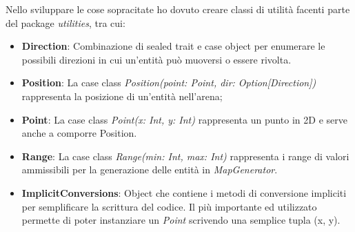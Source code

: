 Nello sviluppare le cose sopracitate ho dovuto creare classi di utilità facenti parte del package \textit{utilities}, tra cui:
\begin{itemize}
    \item \textbf{Direction}: Combinazione di sealed trait e case object per enumerare le possibili direzioni in cui un'entità può muoversi o essere rivolta.
    \item \textbf{Position}: La case class \textit{Position(point: Point, dir: Option[Direction])} rappresenta la posizione di un'entità nell'arena;
    \item \textbf{Point}: La case class \textit{Point(x: Int, y: Int)} rappresenta un punto in 2D e serve anche a comporre Position.
    \item \textbf{Range}: La case class \textit{Range(min: Int, max: Int)} rappresenta i range di valori ammissibili per la generazione delle entità in \textit{MapGenerator}.
    \item \textbf{ImplicitConversions}: Object che contiene i metodi di conversione impliciti per semplificare la scrittura del codice. Il più importante ed utilizzato permette di poter instanziare un \textit{Point} scrivendo una semplice tupla (x, y).
\end{itemize}